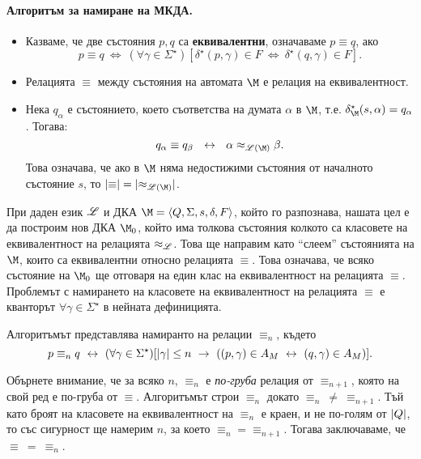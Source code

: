 \paragraph{Алгоритъм за намиране на МКДА.}
\begin{itemize}
\item
  Казваме, че две състояния $p,q$ са {\bf еквивалентни}, означаваме $p\equiv q$,
  ако \[p \equiv q\ \iff\ (\forall \gamma\in \Sigma^\star)[\delta^\star(p,\gamma) \in F\ \iff\ \delta^\star(q,\gamma) \in F].\]
\item
  Релацията $\equiv$ между състояния на автомата $\M$ е релация на еквивалентност. 
\item
  Нека $q_\alpha$ е състоянието, което съответства на думата $\alpha$ в $\M$, т.е.
  $\delta^\star_\M(s,\alpha) = q_\alpha$. Тогава:
  \[q_\alpha \equiv q_\beta\ \iff\ \alpha\approx_{\Ls(\M)} \beta.\]
  Това означава, че ако в $\M$ няма недостижими състояния от началното състояние $s$, то $\abs{\equiv} = \abs{\approx_{\Ls(\M)}}$.
\end{itemize}

При даден език $\mathscr{L}$ и ДКА $\M = \FA$, който го разпознава, нашата цел е да построим нов ДКА $\M_0$,
който има толкова състояния колкото са класовете на еквивалентност на релацията $\approx_{\mathscr{L}}$.
Това ще направим като ``слеем'' състоянията на $\M$, които са еквивалентни относно релацията $\equiv$.
Това означава, че всяко състояние на $\M_0$ ще отговаря на един клас на еквивалентност на релацията $\equiv$.
Проблемът с намирането на класовете на еквивалентност на релацията $\equiv$ е кванторът $\forall \gamma \in \Sigma^\star$
в нейната дефиницията.

Алгоритъмът представлява намиранто на релации $\equiv_n$, където
\[p\equiv_n q \iff (\forall\gamma\in\Sigma^\star)[\abs{\gamma}\leq n\ \rightarrow\ ((p,\gamma)\in A_M \iff 
(q,\gamma) \in A_M)].\]

Обърнете внимание, че за всяко $n$, $\equiv_n$ е {\em по-груба} релация от $\equiv_{n+1}$, 
която на свой ред е по-груба от $\equiv$.
Алгоритъмът строи $\equiv_n$ докато $\equiv_n\ \neq\ \equiv_{n+1}$.
Тъй като броят на класовете на еквивалентност на $\equiv_n$ е краен, и не по-голям от $\vert{Q}\vert$, то 
със сигурност ще намерим $n$, за което $\equiv_n = \equiv_{n+1}$.
Тогава заключаваме, че $\equiv\ =\ \equiv_n$.

